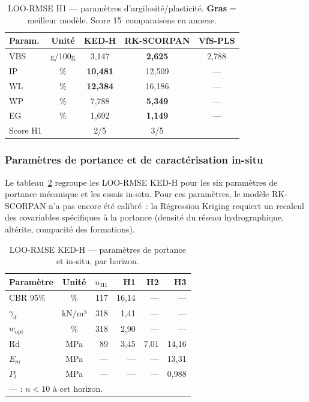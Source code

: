 \documentclass[10pt,a4paper,twocolumn]{article}
\begin{document}
\begin{table}[htbp]
\centering\small
\caption{LOO-RMSE H1 — paramètres d'argilosité/plasticité.
  \textbf{Gras} = meilleur modèle. Score 15~comparaisons en annexe.}
\label{tab:loo_rmse}
\begin{tabular}{lcccc}
\toprule
Param. & Unité & KED-H & RK-SCORPAN & VfS-PLS \\
\midrule
VBS  & g/100g & 3,147          & \textbf{2,625} & 2,788 \\
IP   & \%     & \textbf{10,481}& 12,509         & —     \\
WL   & \%     & \textbf{12,384}& 16,186         & —     \\
WP   & \%     & 7,788          & \textbf{5,349} & —     \\
EG   & \%     & 1,692          & \textbf{1,149} & —     \\
\midrule
Score H1 & & 2/5 & 3/5 & \\
\bottomrule
\end{tabular}
\end{table}

\subsubsection{Paramètres de portance et de caractérisation in-situ}

Le tableau~\ref{tab:loo_v11} regroupe les LOO-RMSE KED-H pour les six
paramètres de portance mécanique et les essais in-situ.
Pour ces paramètres, le modèle RK-SCORPAN n'a pas encore été calibré~: la
Régression Kriging requiert un recalcul des covariables spécifiques à la
portance (densité du réseau hydrographique, altérite, compacité des formations).

\begin{table}[htbp]
\centering\small
\caption{LOO-RMSE KED-H — paramètres de portance et in-situ, par horizon.}
\label{tab:loo_v11}
\begin{tabular}{lcrrrr}
\toprule
Paramètre & Unité & $n_{\mathrm{H1}}$ & H1 & H2 & H3 \\
\midrule
CBR 95\%   & \%    & 117 & 16,14 & —     & —     \\
$\gamma_d$ & kN/m³ & 318 & 1,41  & —     & —     \\
$w_{\mathrm{opt}}$ & \% & 318 & 2,90 & — & —  \\
Rd         & MPa   & 89  & 3,45  & 7,01  & 14,16 \\
$E_m$      & MPa   & —   & —     & —     & 13,31 \\
$P_l$      & MPa   & —   & —     & —     & 0,988 \\
\bottomrule
\multicolumn{6}{l}{\small — : $n < 10$ à cet horizon.}
\end{tabular}
\end{table}
\end{document}

